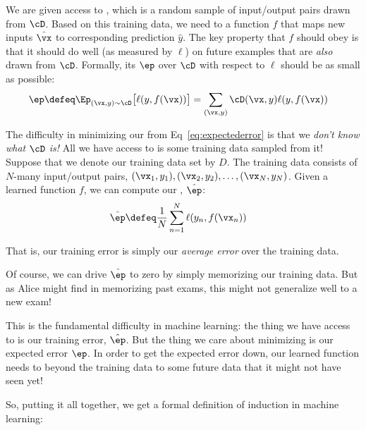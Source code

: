 We are given access to , which is a random
sample of input/output pairs drawn from $\cD$.  Based on this training
data, we need to  a function $f$ that maps new inputs
$\hat \vx$ to corresponding prediction $\hat y$.  The key property
that $f$ should obey is that it should do well (as measured by $\ell$)
on future examples that are \emph{also} drawn from $\cD$.  Formally,
its  $\ep$ over $\cD$ with respect to $\ell$
should be as small as possible:
\begin{align} \label{eq:expectederror}
\ep
&\defeq
\Ep_{(\vx,y) \sim \cD} \big[ \ell(y, f(\vx)) \big]
=
\sum_{(\vx,y)} \cD(\vx,y) \ell(y, f(\vx))
\end{align}

The difficulty in minimizing our  from
Eq~\eqref{eq:expectederror} is that we \emph{don't know what $\cD$
  is!}  All we have access to is some training data sampled from it!
Suppose that we denote our training data set by $D$.  The training
data consists of $N$-many input/output pairs, $(\vx_1,y_1),
(\vx_2,y_2), \dots, (\vx_N,y_N)$.  Given a learned function $f$, we
can compute our , $\hat \ep$:
\begin{align} \label{eq:trainingerror}
\hat \ep
&\defeq
\frac 1 N \sum_{n=1}^N \ell(y_n, f(\vx_n))
\end{align}

That is, our training error is simply our \emph{average error} over
the training data.  

Of course, we can drive $\hat \ep$ to zero by simply memorizing our
training data.  But as Alice might find in memorizing past exams, this
might not generalize well to a new exam!

This is the fundamental difficulty in machine learning: the thing we
have access to is our training error, $\hat \ep$.  But the thing we care
about minimizing is our expected error $\ep$.  In order to get the
expected error down, our learned function needs to
 beyond the training data to some future data that
it might not have seen yet!

So, putting it all together, we get a formal definition of induction in
machine learning: 

